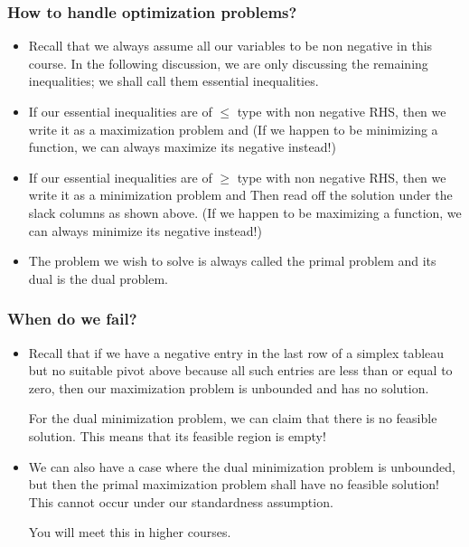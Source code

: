 \begin{frame}%
  \frametitle{How to handle optimization problems?}
  \begin{itemize}%
\item
Recall that we always assume all our variables to be non negative in
this course. In the following discussion, we are only discussing the
remaining inequalities; we shall call them essential inequalities.

\item 
If our essential inequalities are of $\le$ type with non negative RHS,
then we write it as a maximization problem and  (If we happen to be minimizing a function, we can always
maximize its negative instead!)

\item
If our essential inequalities are of $\ge$ type with non negative RHS,
then we write it as a minimization problem and  Then read off the solution under the slack columns as
shown above. (If we happen to be maximizing a function, we can always
minimize its negative instead!)

\item {} The problem we wish to solve is always called
the  primal problem and its dual is the dual problem.

\end{itemize}
\end{frame}


\begin{frame}%
  \frametitle{ When do we fail?}
  \begin{itemize}%

\item Recall that if we have a negative entry in the last row of a
simplex tableau but no suitable pivot above because all such entries are
less than or equal to zero, then our maximization problem is unbounded
and has no solution.

For the dual minimization problem, we can claim that there is no
feasible solution. This means that its feasible region is empty!

\item We can also have a case where the dual minimization problem is
unbounded, but then the primal maximization problem shall have no
feasible solution! This cannot occur  under our standardness assumption.

You will meet this in higher courses.

\end{itemize}
\end{frame}
